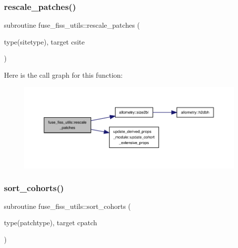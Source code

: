\subsubsection{\texorpdfstring{rescale\+\_\+patches()}{rescale\_patches()}}
{\footnotesize\ttfamily subroutine fuse\+\_\+fiss\+\_\+utils\+::rescale\+\_\+patches (\begin{DoxyParamCaption}\item[{type(sitetype), target}]{csite }\end{DoxyParamCaption})}

Here is the call graph for this function\+:
\nopagebreak
\begin{figure}[H]
\begin{center}
\leavevmode
\includegraphics[width=350pt]{namespacefuse__fiss__utils_ab3b0eeed8a63cc2f4b866ac243e25ec6_cgraph}
\end{center}
\end{figure}
\mbox{\label{namespacefuse__fiss__utils_a31e4835d2465d1400c7cbbb51976b341}} 
\subsubsection{\texorpdfstring{sort\+\_\+cohorts()}{sort\_cohorts()}}
{\footnotesize\ttfamily subroutine fuse\+\_\+fiss\+\_\+utils\+::sort\+\_\+cohorts (\begin{DoxyParamCaption}\item[{type(patchtype), target}]{cpatch }\end{DoxyParamCaption})}

